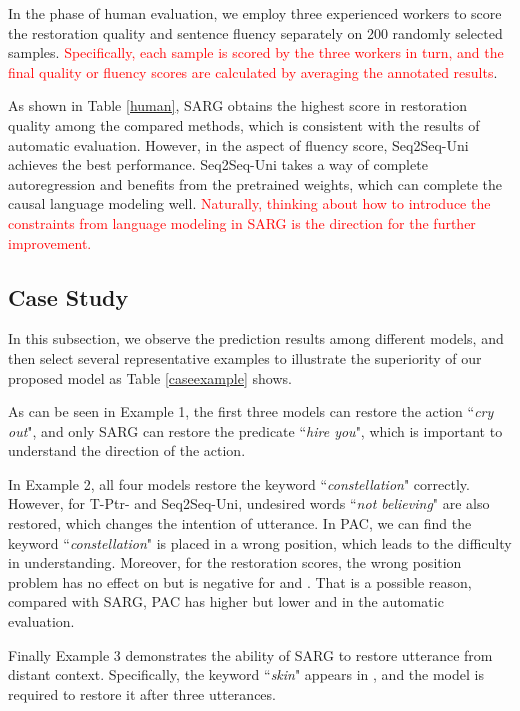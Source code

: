 In the phase of human evaluation, we employ three experienced workers to score the restoration quality and sentence fluency separately on 200 randomly selected samples. \textcolor{red}{Specifically, each sample is scored by the three workers in turn, and the final quality or fluency scores are calculated by averaging the annotated results}.

As shown in Table \ref{human}, SARG obtains the highest score in restoration quality among the compared methods, which is consistent with the results of automatic evaluation. However, in the aspect of fluency score, Seq2Seq-Uni achieves the best performance. Seq2Seq-Uni takes a way of complete autoregression and benefits from the pretrained weights, which can complete the causal language modeling well. 
\textcolor{red}{Naturally, thinking about how to introduce the constraints from language modeling in SARG is the direction for the further improvement.}

\subsection{Case Study}\label{casestudy}

In this subsection, we observe the prediction results among different models, and then select several representative examples to illustrate the superiority of our proposed model as Table \ref{caseexample} shows.

As can be seen in Example 1, the first three models can restore the action ``\textit{cry out}", and only SARG can restore the predicate ``\textit{hire you}", which is important to understand the direction of the action. 

In Example 2, all four models restore the keyword ``\textit{constellation}" correctly. However, for T-Ptr- and Seq2Seq-Uni, undesired words ``\textit{not believing}" are also restored, which changes the intention of utterance. In PAC, we can find the keyword ``\textit{constellation}" is placed in a wrong position, which leads to the difficulty in understanding. Moreover, for the restoration scores, the wrong position problem has no effect on  but is negative for  and . That is a possible reason, compared with SARG, PAC has higher  but lower  and  in the automatic evaluation.

Finally Example 3 demonstrates the ability of SARG to restore utterance from distant context. Specifically, the keyword ``\textit{skin}" appears in , and the model is required to restore it after three utterances.

